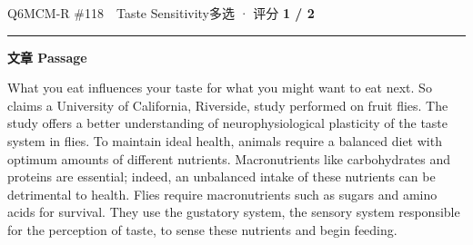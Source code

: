 \documentclass[11pt]{article}
\newcommand{\ptesub}[1]{%
  \par\needspace{2\baselineskip}\smallskip
  {\color{cAccent}\rule[-0.2ex]{3pt}{1.05em}}\hspace{6pt}%
  {\bfseries\color{cHead}#1}\par\nopagebreak\smallskip}
\begin{document}
\begin{qblock}{Q6\quad MCM-R \#118\ \ Taste Sensitivity}{多选 · 评分 \textcolor{cAccent}{\bfseries 1 / 2}}
\ptesub{文章 Passage}
\begin{promptbox}
What you eat influences your taste for what you might want to eat next. So claims a University of California, Riverside, study performed on fruit flies. The study offers a better understanding of neurophysiological plasticity of the taste system in flies. To maintain ideal health, animals require a balanced diet with optimum amounts of different nutrients. Macronutrients like carbohydrates and proteins are essential; indeed, an unbalanced intake of these nutrients can be detrimental to health. Flies require macronutrients such as sugars and amino acids for survival. They use the gustatory system, the sensory system responsible for the perception of taste, to sense these nutrients and begin feeding.


\end{promptbox}
\end{qblock}
\end{document}
